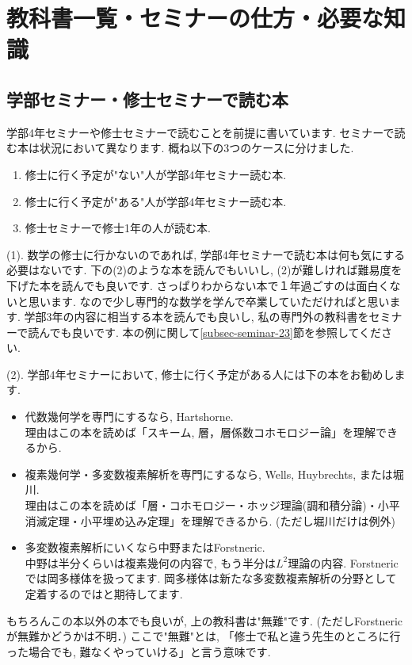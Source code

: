 
\section{教科書一覧・セミナーの仕方・必要な知識}
\label{sec-2}

\subsection{学部セミナー・修士セミナーで読む本}
学部4年セミナーや修士セミナーで読むことを前提に書いています.
セミナーで読む本は状況において異なります. 概ね以下の3つのケースに分けました. 
\begin{enumerate}[label=$(\arabic*)$]
  \setlength{\parskip}{0cm} %
  \setlength{\itemsep}{0cm} %
 \item 修士に行く予定が"ない"人が学部4年セミナー読む本.
\item 修士に行く予定が"ある"人が学部4年セミナー読む本.
\item 修士セミナーで修士1年の人が読む本.
\end{enumerate}

(1). 数学の修士に行かないのであれば, 学部4年セミナーで読む本は何も気にする必要はないです. 
下の(2)のような本を読んでもいいし,  (2)が難しければ難易度を下げた本を読んでも良いです. 
さっぱりわからない本で１年過ごすのは面白くないと思います. なので少し専門的な数学を学んで卒業していただければと思います. 
学部3年の内容に相当する本を読んでも良いし, 私の専門外の教科書をセミナーで読んでも良いです. 本の例に関して\ref{subsec-seminar-23}節を参照してください. 

(2). 学部4年セミナーにおいて, 修士に行く予定がある人には下の本をお勧めします.

\begin{tcolorbox}[mybox]
\begin{itemize}[left=0pt]
  \setlength{\parskip}{0cm} %
  \setlength{\itemsep}{8pt} %
\item 代数幾何学を専門にするなら, Hartshorne. \\
理由はこの本を読めば「スキーム, 層，層係数コホモロジー論」を理解できるから.
\item 複素幾何学・多変数複素解析を専門にするなら, Wells, Huybrechts, または堀川. \\ 
理由はこの本を読めば「層・コホモロジー・ホッジ理論(調和積分論)・小平消滅定理・小平埋め込み定理」を理解できるから. (ただし堀川だけは例外)
\item 多変数複素解析にいくなら中野またはForstneric. \\
中野は半分くらいは複素幾何の内容で, もう半分は$L^2$理論の内容. 
Forstnericでは岡多様体を扱ってます. 岡多様体は新たな多変数複素解析の分野として定着するのではと期待してます. 
\end{itemize}
\end{tcolorbox}
もちろんこの本以外の本でも良いが, 上の教科書は"無難"です. (ただしForstnericが無難かどうかは不明．)
ここで"無難"とは, 「修士で私と違う先生のところに行った場合でも, 難なくやっていける」と言う意味です. 

